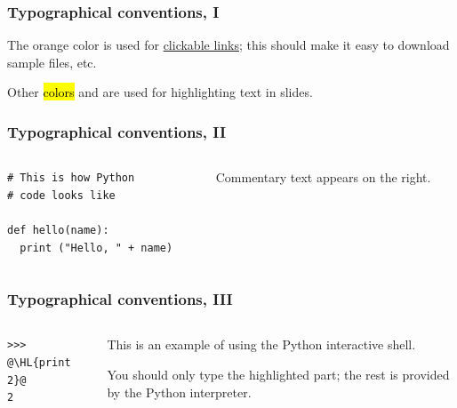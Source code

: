 \documentclass[english,serif,mathserif,xcolor=pdftex,dvipsnames,table]{beamer}
\begin{document}
\begin{frame}
  \frametitle{Typographical conventions, I}

  The orange color is used for
  \href{http://www.gc3.uzh.ch/}{clickable
    links}; this should make it easy to download sample files, etc.

  \+
  Other \hl{colors} and  are used for highlighting
  text in slides.
\end{frame}


\begin{frame}[fragile]
  \frametitle{Typographical conventions, II}

    \begin{columns}[t]
    \begin{column}{0.5\textwidth}
\begin{lstlisting}
# This is how Python
# code looks like

def hello(name):
  print ("Hello, " + name)
\end{lstlisting}
    \end{column}
    \begin{column}{0.5\textwidth}
      \raggedleft Commentary text appears on the right.
    \end{column}
  \end{columns}
\end{frame}


\begin{frame}[fragile]
  \frametitle{Typographical conventions, III}

    \begin{columns}[t]
    \begin{column}{0.5\textwidth}
\begin{lstlisting}
>>> @\HL{print 2}@
2
\end{lstlisting}
    \end{column}
    \begin{column}{0.5\textwidth}
      \raggedleft
      This is an example of using the Python interactive shell.

      \+
      You should only type the highlighted part; the rest is
      provided by the Python interpreter.
    \end{column}
  \end{columns}
\end{frame}
\end{document}
